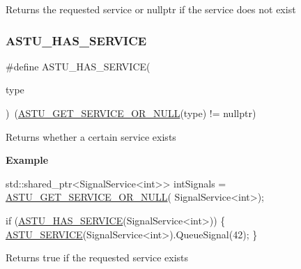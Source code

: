 \begin{DoxyReturn}{Returns}
the requested service or {\ttfamily nullptr} if the service does not exist 
\end{DoxyReturn}
\mbox{\label{group__srv__group_ga8b3cd4edfd24593b12bc662acf62e9a1}} 
\subsubsection{\texorpdfstring{A\+S\+T\+U\+\_\+\+H\+A\+S\+\_\+\+S\+E\+R\+V\+I\+CE}{ASTU\_HAS\_SERVICE}}
{\footnotesize\ttfamily \#define A\+S\+T\+U\+\_\+\+H\+A\+S\+\_\+\+S\+E\+R\+V\+I\+CE(\begin{DoxyParamCaption}\item[{}]{type }\end{DoxyParamCaption})~(\hyperlink{group__srv__group_ga223765690bb6ade99e1e5f954f096cfb}{A\+S\+T\+U\+\_\+\+G\+E\+T\+\_\+\+S\+E\+R\+V\+I\+C\+E\+\_\+\+O\+R\+\_\+\+N\+U\+LL}(type) != nullptr)}

Returns whether a certain service exists

{\bfseries Example}


\begin{DoxyCode}
std::shared\_ptr<SignalService<int>> intSignals = \hyperlink{group__srv__group_ga223765690bb6ade99e1e5f954f096cfb}{ASTU\_GET\_SERVICE\_OR\_NULL}(
      SignalService<int>);

\textcolor{keywordflow}{if} (\hyperlink{group__srv__group_ga8b3cd4edfd24593b12bc662acf62e9a1}{ASTU\_HAS\_SERVICE}(SignalService<int>)) \{
  \hyperlink{group__srv__group_ga42575546f01bf92989d08916564ffc66}{ASTU\_SERVICE}(SignalService<int>).QueueSignal(42);
\}
\end{DoxyCode}


\begin{DoxyReturn}{Returns}
{\ttfamily true} if the requested service exists 
\end{DoxyReturn}
\mbox{\label{group__srv__group_ga640af14a801ce66a6286ca8bc4862473}} 
